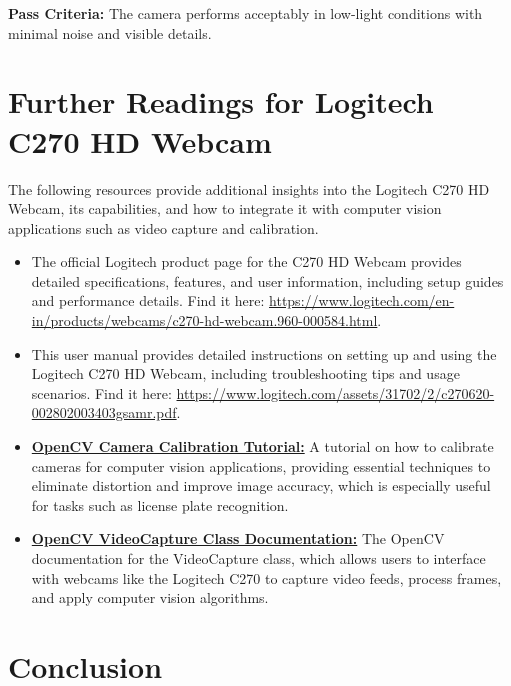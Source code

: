 \textbf{Pass Criteria:} 
The camera performs acceptably in low-light conditions with minimal noise and visible details.

\section{Further Readings for Logitech C270 HD Webcam}

The following resources provide additional insights into the Logitech C270 HD Webcam, its capabilities, and how to integrate it with computer vision applications such as video capture and calibration.

\begin{itemize}
	\item 	The official Logitech product page for the C270 HD Webcam provides detailed specifications, features, and user information, including setup guides and performance details. Find it here:  
	\href{https://www.logitech.com/en-in/products/webcams/c270-hd-webcam.960-000584.html}{https://www.logitech.com/en-in/products/webcams/c270-hd-webcam.960-000584.html}.
	
	
	
	\item This user manual provides detailed instructions on setting up and using the Logitech C270 HD Webcam, including troubleshooting tips and usage scenarios. Find it here:  
	\href{https://www.logitech.com/assets/31702/2/c270620-002802003403gsamr.pdf}{https://www.logitech.com/assets/31702/2/c270620-002802003403gsamr.pdf}.
	
	
	\item \textbf{\href{https://docs.opencv.org/4.x/dc/dbb/tutorial_py_calibration.html}{OpenCV Camera Calibration Tutorial:}}  
	A tutorial on how to calibrate cameras for computer vision applications, providing essential techniques to eliminate distortion and improve image accuracy, which is especially useful for tasks such as license plate recognition.
	
	\item \textbf{\href{https://docs.opencv.org/3.4/d8/dfe/classcv_1_1VideoCapture.html}{OpenCV VideoCapture Class Documentation:}}  
	The OpenCV documentation for the VideoCapture class, which allows users to interface with webcams like the Logitech C270 to capture video feeds, process frames, and apply computer vision algorithms.
\end{itemize}

\section{Conclusion}

